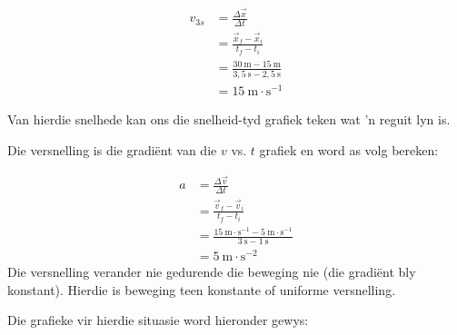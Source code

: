             
\begin{align*}
    {v}_{3s}&= \frac{\Delta \vec{x}}{\Delta t}\\ 
    &= \frac{\vec{x}_{f}-\vec{x}_{i}}{{t}_{f}-{t}_{i}}\\ 
    &= \frac{30~\text{m}-15~\text{m}}{3,5~\text{s}-2,5~\text{s}}\\ 
    &= 15~\text{m}\ensuremath{\cdot}{\text{s}}^{-1}
  \end{align*}
        \par 
Van hierdie snelhede kan ons die snelheid-tyd grafiek teken wat 'n reguit lyn is.\par
Die versnelling is die gradi\"ent van die $v$ vs. $t$ grafiek en word as volg bereken:\par
\begin{align*}
    a&= \frac{\Delta \vec{v}}{\Delta t} \\ 
    &= \frac{\vec{v}_{f}-\vec{v}_{i}}{{t}_{f}-{t}_{i}}\\ 
    &= \frac{15~\text{m}\ensuremath{\cdot}{\text{s}}^{-1}-5~\text{m}\ensuremath{\cdot}{\text{s}}^{-1}}{3~\text{s}-1~\text{s}}\\ 
    &= 5~\text{m}\ensuremath{\cdot}{\text{s}}^{-2}
\end{align*}
Die versnelling verander nie gedurende die beweging nie (die gradi\"ent bly konstant). Hierdie is beweging teen konstante of uniforme versnelling. \par

Die grafieke vir hierdie situasie word hieronder gewys:
    
